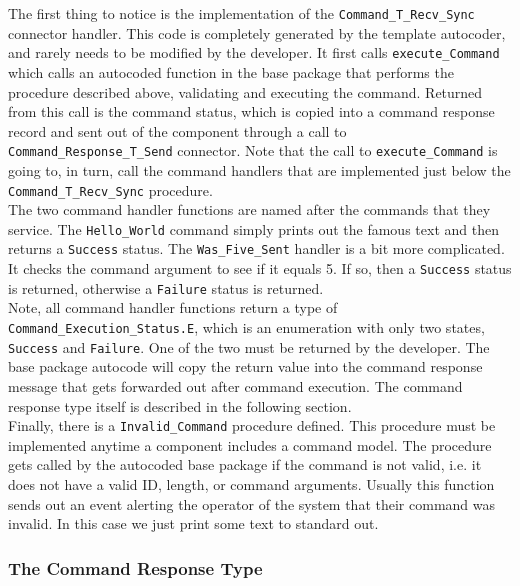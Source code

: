 The first thing to notice is the implementation of the \texttt{Command\_T\_Recv\_Sync} connector handler. This code is completely generated by the template autocoder, and rarely needs to be modified by the developer. It first calls \texttt{execute\_Command} which calls an autocoded function in the base package that performs the procedure described above, validating and executing the command. Returned from this call is the command status, which is copied into a command response record and sent out of the component through a call to \texttt{Command\_Response\_T\_Send} connector. Note that the call to \texttt{execute\_Command} is going to, in turn, call the command handlers that are implemented just below the \texttt{Command\_T\_Recv\_Sync} procedure. \\

The two command handler functions are named after the commands that they service. The \texttt{Hello\_World} command simply prints out the famous text and then returns a \texttt{Success} status. The \texttt{Was\_Five\_Sent} handler is a bit more complicated. It checks the command argument to see if it equals 5. If so, then a \texttt{Success} status is returned, otherwise a \texttt{Failure} status is returned. \\

Note, all command handler functions return a type of \texttt{Command\_Execution\_Status.E}, which is an enumeration with only two states, \texttt{Success} and \texttt{Failure}. One of the two must be returned by the developer. The base package autocode will copy the return value into the command response message that gets forwarded out after command execution. The command response type itself is described in the following section. \\

Finally, there is a \texttt{Invalid\_Command} procedure defined. This procedure must be implemented anytime a component includes a command model. The procedure gets called by the autocoded base package if the command is not valid, i.e. it does not have a valid ID, length, or command arguments. Usually this function sends out an event alerting the operator of the system that their command was invalid. In this case we just print some text to standard out. \\

\subsubsection{The Command Response Type}


